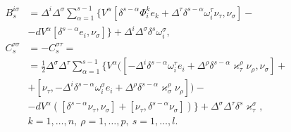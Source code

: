 \begin{lem}
\begin{equation}
\begin{split}
%


B^{i\sigma}_s &= \Delta^i\Delta^{\sigma}\sum_{\alpha=1}^{s-1}\{


V^{\alpha}[\delta^{s-\alpha}\Phi^k_ie_k+


\Delta^{\tau}\delta^{s-\alpha}\omega^{\tau}_i\nu_{\tau},\nu_{\sigma}]-\\


& - dV^{\alpha}[\delta^{s-\alpha}e_i,\nu_{\sigma}]\}+


\Delta^i\Delta^{\sigma}\delta^s\omega^{\sigma}_i,\\[2mm]


%


C^{\tau\sigma}_s &= -C^{\sigma\tau}_s=\\


& =\frac{1}{2}\Delta^{\sigma}\Delta^{\tau}\sum_{\alpha=1}^{s-1}\{


V^{\alpha}([-\Delta^i\delta^{s-\alpha}\omega^{\tau}_ie_i+


\Delta^{\rho}\delta^{s-\alpha}\varkappa^{\rho}_{\tau}


\nu_{\rho},\nu_{\sigma}]+\\


&+[\nu_{\tau},-\Delta^i\delta^{s-\alpha}\omega^{\sigma}_ie_i+


\Delta^{\rho}\delta^{s-\alpha}\varkappa^{\rho}_{\sigma}\nu_{\rho}])-\\


&-dV^{\alpha}([\delta^{s-\alpha}\nu_{\tau},\nu_{\sigma}]+


[\nu_{\tau},\delta^{s-\alpha}\nu_{\sigma}])\}


+\Delta^{\sigma}\Delta^{\tau}\delta^s\varkappa_{\tau}^{\sigma},\\


& k=1,\dotsc,n,\ \rho=1,\dotsc,p,\ s=1,\dotsc,l.


\end{split}


\end{equation}


\end{lem}





